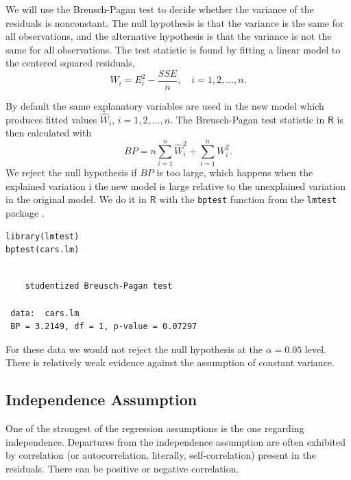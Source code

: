 \documentclass[captions=tableheading]{scrbook}
\begin{document}
We will use the Breusch-Pagan test to decide whether the variance of the residuals is nonconstant. The null hypothesis is that the variance is the same for all observations, and the alternative hypothesis is that the variance is not the same for all observations. The test statistic is found by fitting a linear model to the centered squared residuals,
\begin{equation}
W_{i} = E_{i}^{2} - \frac{SSE}{n}, \quad i=1,2,\ldots,n.
\end{equation}

By default the same explanatory variables are used in the new model which produces fitted values \(\hat{W}_{i}\), \(i=1,2,\ldots,n\). The Breusch-Pagan test statistic in \(\mathsf{R}\) is then calculated with 
\begin{equation}
BP=n\sum_{i=1}^{n}\hat{W}_{i}^{2}\div\sum_{i=1}^{n}W_{i}^{2}.
\end{equation}
We reject the null hypothesis if \(BP\) is too large, which happens when the explained variation i the new model is large relative to the unexplained variation in the original model.
We do it in \(\mathsf{R}\) with the \texttt{bptest} function from the \texttt{lmtest} package \cite{Zeileislmtest}. 

\lstset{language=R}
\begin{lstlisting}
library(lmtest)
bptest(cars.lm)
\end{lstlisting}

\begin{verbatim}
 
 	studentized Breusch-Pagan test
 
 data:  cars.lm 
 BP = 3.2149, df = 1, p-value = 0.07297
\end{verbatim}

For these data we would not reject the null hypothesis at the \(\alpha=0.05\) level. There is relatively weak evidence against the assumption of constant variance. 
\subsection{Independence Assumption}
\label{sec-11-4-3}
\label{sub-Independence-Assumption}


One of the strongest of the regression assumptions is the one regarding independence. Departures from the independence assumption are often exhibited by correlation (or autocorrelation, literally, self-correlation) present in the residuals. There can be positive or negative correlation.
\end{document}
